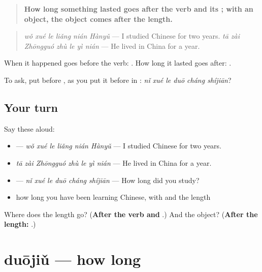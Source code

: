 \begin{grammarlens}[title={Grammar Lens: the length after the verb}]
\begin{quote}
\textbf{How long something lasted goes after the verb and its ; with an object, the object comes after the length.}
\end{quote}

\begin{quote}
\textbf{} \emph{wǒ xué le liǎng nián Hànyǔ} — I studied Chinese for two years. \emph{tā zài Zhōngguó zhù le yì nián} — He lived in China for a year.
\end{quote}

When it happened goes before the verb: . How long it lasted goes after: .

To ask, put  before , as you put it before  in : \textbf{} \emph{nǐ xué le duō cháng shíjiān}?
\end{grammarlens}

\subsection*{Your turn}
Say these aloud:

\begin{itemize}
\raggedright
  \item {} — \emph{wǒ xué le liǎng nián Hànyǔ} — I studied Chinese for two years.
  \item \emph{tā zài Zhōngguó zhù le yì nián} — He lived in China for a year.
  \item {} — \emph{nǐ xué le duō cháng shíjiān} — How long did you study?
  \item how long you have been learning Chinese, with  and the length
\end{itemize}

\begin{tcolorbox}[breakable,colback=teal!4,colframe=teal!35!black,title={Before you move on}]
Where does the length go? (\textbf{After the verb and }.) And the object? (\textbf{After the length: }.)
\end{tcolorbox}
\section[duōjiǔ]{duōjiǔ — how long}

\label{lesson:ZH-C286-duojiu}



